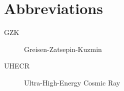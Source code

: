 \chapter*{Abbreviations}
\label{ch:abbreviations}

\begin{description}
	\item[GZK] Greisen-Zatsepin-Kuzmin
	\item[UHECR] Ultra-High-Energy Cosmic Ray
\end{description}
